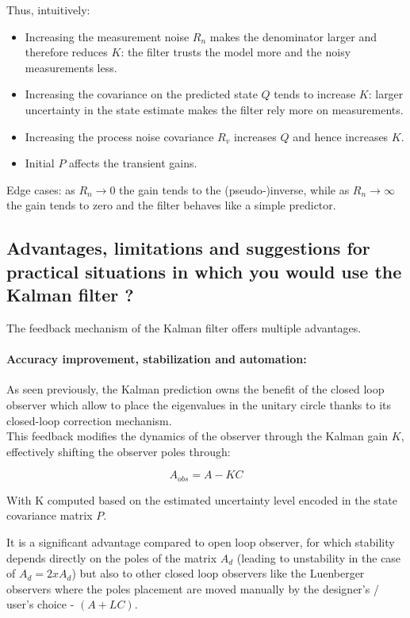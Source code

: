Thus, intuitively:
\begin{itemize}
    \item Increasing the measurement noise \(R_n\) makes the denominator larger and therefore reduces \(K\): the filter trusts the model more and the noisy measurements less.
    \item Increasing the covariance on the predicted state \(Q\) tends to increase \(K\): larger uncertainty in the state estimate makes the filter rely more on measurements.
    \item Increasing the process noise covariance \(R_v\) increases \(Q\) and hence increases \(K\).
    \item Initial \(P\) affects the transient gains.
\end{itemize}
Edge cases: as \(R_n\to 0\) the gain tends to the (pseudo‑)inverse, while as \(R_n\to\infty\) the gain tends to zero and the filter behaves like a simple predictor.

\subsection{Advantages, limitations and suggestions for practical situations in which you would use the Kalman filter ?}

The feedback mechanism of the Kalman filter offers multiple advantages.
\paragraph{Accuracy improvement, stabilization and automation:}
As seen previously, the Kalman prediction owns the benefit of the closed loop observer which allow to place the eigenvalues in the unitary circle thanks to its closed-loop correction mechanism.\\
This feedback modifies the dynamics of the observer through the Kalman gain $K$, effectively shifting the observer poles through:

\begin{equation}
A_{obs} = A-KC
\end{equation}

With K computed based on the estimated uncertainty level encoded in the state covariance matrix $P$.

It is a significant advantage compared to open loop observer, for which stability depends directly on the poles of the matrix $A_d$ (leading to unstability in the case of $A_d = 2 x A_d$) but also to other closed loop observers like the Luenberger observers where the poles placement
are moved manually by the designer's / user's choice - $(A+LC)$.

